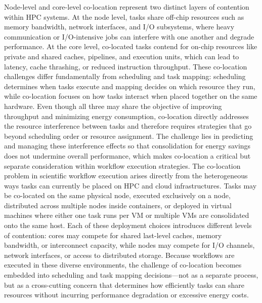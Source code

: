 Node-level and core-level co-location represent two distinct layers of contention within HPC systems. At the node level, tasks share off-chip resources such as memory bandwidth, network interfaces, and I/O subsystems, where heavy communication or I/O-intensive jobs can interfere with one another and degrade performance. At the core level, co-located tasks contend for on-chip resources like private and shared caches, pipelines, and execution units, which can lead to latency, cache thrashing, or reduced instruction throughput. These co-location challenges differ fundamentally from scheduling and task mapping: scheduling determines when tasks execute and mapping decides on which resource they run, while co-location focuses on how tasks interact when placed together on the same hardware. Even though all three may share the objective of improving throughput and minimizing energy consumption, co-location directly addresses the resource interference between tasks and therefore requires strategies that go beyond scheduling order or resource assignment. The challenge lies in predicting and managing these interference effects so that consolidation for energy savings does not undermine overall performance, which makes co-location a critical but separate consideration within workflow execution strategies.
The co-location problem in scientific workflow execution arises directly from the heterogeneous ways tasks can currently be placed on HPC and cloud infrastructures. Tasks may be co-located on the same physical node, executed exclusively on a node, distributed across multiple nodes inside containers, or deployed in virtual machines where either one task runs per VM or multiple VMs are consolidated onto the same host. Each of these deployment choices introduces different levels of contention: cores may compete for shared last-level caches, memory bandwidth, or interconnect capacity, while nodes may compete for I/O channels, network interfaces, or access to distributed storage. Because workflows are executed in these diverse environments, the challenge of co-location becomes embedded into scheduling and task mapping decisions—not as a separate process, but as a cross-cutting concern that determines how efficiently tasks can share resources without incurring performance degradation or excessive energy costs.
